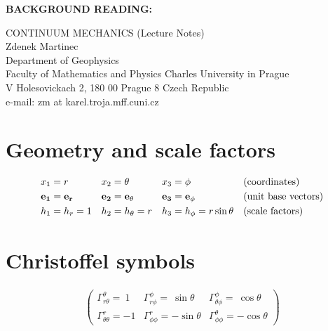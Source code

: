 \documentclass[11pt]{article}
\begin{document}
\maketitle

\noindent
{\bf{BACKGROUND READING:}} \\

\vspace{0.3cm}

\noindent
CONTINUUM MECHANICS (Lecture Notes) \\
Zdenek Martinec \\
Department of Geophysics \\
Faculty of Mathematics and Physics Charles University in Prague \\
V Holesovickach 2, 180 00 Prague 8 Czech Republic \\
e-mail: zm at karel.troja.mff.cuni.cz \\

\section{Geometry and scale factors}

\begin{align}
& x_1 = r & & x_2 = \theta & & x_3 = \phi & & \mbox{(coordinates)} \\
& {\bf{e_1 = e_r}} & &  {\bf{e_2 = e_\theta}} & & {\bf{e_3 = e_\phi}} && \mbox{(unit base vectors)} \\
& h_1 = h_r = 1 & &  h_2 = h_\theta = r & & h_3 = h_\phi = r \sin{\theta} & & \mbox{(scale factors)}
\end{align}

\section{Christoffel symbols}

\begin{align}
\begin{pmatrix}
\Gamma_{r\theta}^\theta = \ 1  &  \Gamma_{r\phi}^\phi = \ \sin{\theta} & \Gamma_{\theta \phi}^{\phi} = \ \cos{\theta}   \\
\Gamma_{\theta \theta}^r = -1   &  \Gamma_{\phi \phi}^r = -\sin{\theta}  & \Gamma_{\phi \phi}^{\theta} = -\cos{\theta}  
\end{pmatrix}
\end{align}

\end{document}
